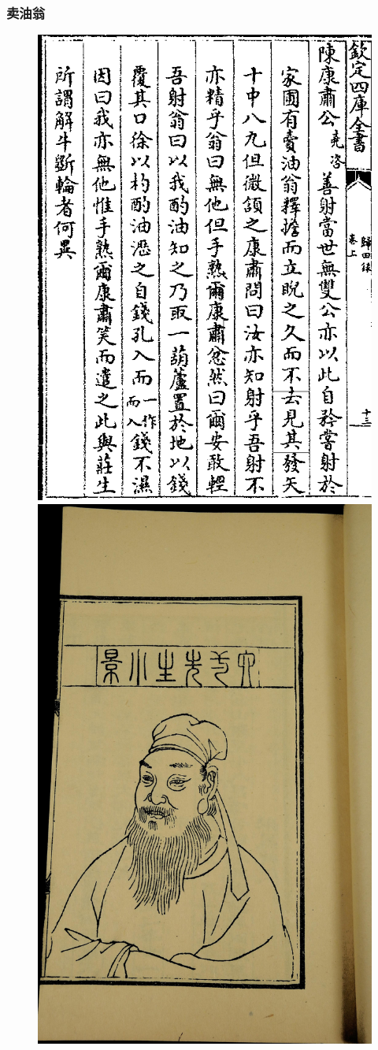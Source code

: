 \documentclass[cjk,slidestop,handout,compress,mathserif,blue]{beamer}	%
\begin{document}
\frame
{
	\frametitle{卖油翁}
\begin{figure}[h!]
\centering
\vspace{-10.5pt}
\includegraphics[height=0.65\textwidth]{Figures/Sale_Oil_Ouyang.png}
\hspace{1pt}
\includegraphics[height=0.65\textwidth]{Figures/Ouyang_Xiu-2.jpg}
\caption{\fontsize{6.2pt}{5.2pt}\selectfont{欧阳修(1007-1072)~《欧阳文忠公文集$\cdot$归田录》~卷上}}
\label{Sale_oil}
\end{figure}

}
\end{document}
